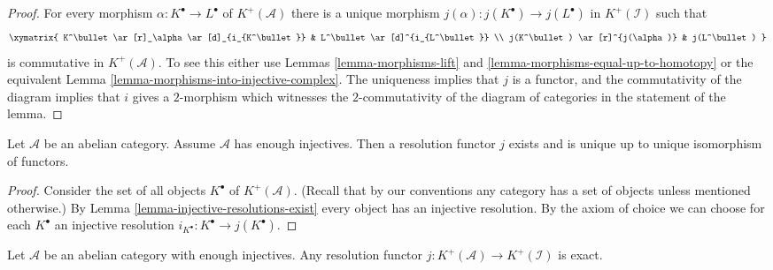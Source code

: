\begin{proof}
For every morphism $\alpha : K^\bullet \to L^\bullet$ of $K^{+}(\mathcal{A})$
there is a unique morphism
$j(\alpha) : j(K^\bullet) \to j(L^\bullet)$ in $K^{+}(\mathcal{I})$
such that
$$
\xymatrix{
K^\bullet \ar[r]_\alpha \ar[d]_{i_{K^\bullet}} &
L^\bullet \ar[d]^{i_{L^\bullet}} \\
j(K^\bullet) \ar[r]^{j(\alpha)} & j(L^\bullet)
}
$$
is commutative in $K^{+}(\mathcal{A})$. To see this either use
Lemmas \ref{lemma-morphisms-lift} and
\ref{lemma-morphisms-equal-up-to-homotopy}
or the equivalent
Lemma \ref{lemma-morphisms-into-injective-complex}.
The uniqueness implies that $j$ is a functor, and the commutativity of
the diagram implies that $i$ gives a $2$-morphism which witnesses the
$2$-commutativity of the diagram of categories in the statement of
the lemma.
\end{proof}

\begin{lemma}
\label{lemma-into-derived-category}
Let $\mathcal{A}$ be an abelian category.
Assume $\mathcal{A}$ has enough injectives.
Then a resolution functor $j$ exists and is
unique up to unique isomorphism of functors.
\end{lemma}

\begin{proof}
Consider the set of all objects $K^\bullet$ of $K^{+}(\mathcal{A})$.
(Recall that by our conventions any category has a set of
objects unless mentioned otherwise.)
By Lemma \ref{lemma-injective-resolutions-exist} every object
has an injective resolution.
By the axiom of choice we can choose for each $K^\bullet$
an injective resolution $i_{K^\bullet} : K^\bullet \to j(K^\bullet)$.
\end{proof}

\begin{lemma}
\label{lemma-j-is-exact}
Let $\mathcal{A}$ be an abelian category with enough injectives.
Any resolution functor
$j : K^{+}(\mathcal{A}) \to K^{+}(\mathcal{I})$
is exact.
\end{lemma}

